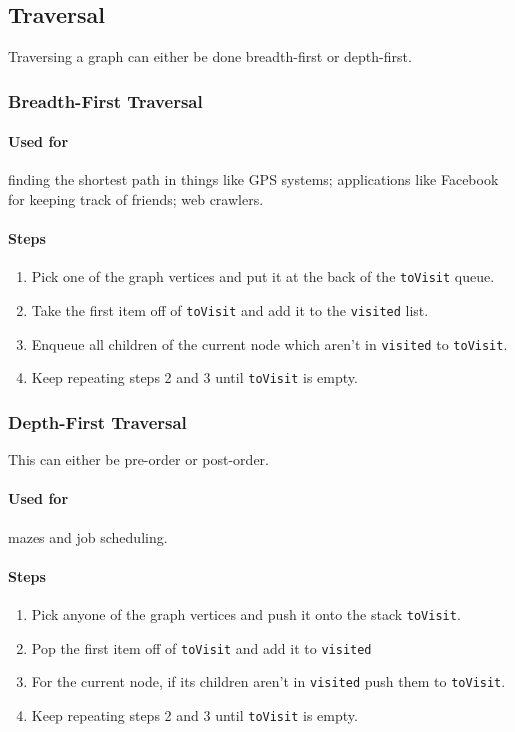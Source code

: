 \documentclass[a4paper,11pt, twocolumn]{article}
\begin{document}
\subsection{Traversal}
Traversing a graph can either be done breadth-first or depth-first. 
\subsubsection{Breadth-First Traversal}
\paragraph{Used for} finding the shortest path in things like GPS systems; applications like Facebook for keeping track of friends; web crawlers.
\paragraph{Steps}
\begin{enumerate}
    \item Pick one of the graph vertices and put it at the back of the \verb|toVisit| queue.
    \item Take the first item off of \verb|toVisit| and add it to the \verb|visited| list.
    \item Enqueue all children of the current node which aren't in \verb|visited| to \verb|toVisit|.
    \item Keep repeating steps 2 and 3 until \verb|toVisit| is empty.
\end{enumerate}
\subsubsection{Depth-First Traversal}
This can either be pre-order or post-order.
\paragraph{Used for} mazes and job scheduling.
\paragraph{Steps}
\begin{enumerate}
    \item Pick anyone of the graph vertices and push it onto the stack \verb|toVisit|.
    \item Pop the first item off of \verb|toVisit| and add it to \verb|visited|
    \item For the current node, if its children aren't in \verb|visited| push them to \verb|toVisit|.
    \item Keep repeating steps 2 and 3 until \verb|toVisit| is empty.
\end{enumerate}
\end{document}
